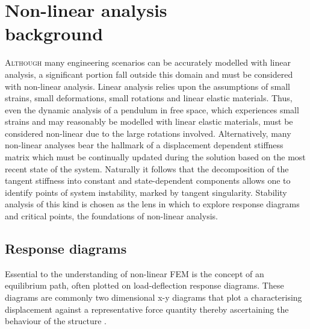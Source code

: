 


\chapter[Non-linear analysis background]{Non-linear analysis \\ background}
\label{chap:chapter_2_2}

\renewcommand{\Thema}{Non-linear analysis background}

\lettrine[lines=2]{A}{lthough} many engineering scenarios can be accurately modelled with linear analysis, a significant portion fall outside this domain and must be considered with non-linear analysis. Linear analysis relies upon the assumptions of small strains, small deformations, small rotations and linear elastic materials. Thus, even the dynamic analysis of a pendulum in free space, which experiences small strains and may reasonably be modelled with linear elastic materials, must be considered non-linear due to the large rotations involved. Alternatively, many non-linear analyses bear the hallmark of a displacement dependent stiffness matrix which must be continually updated during the solution based on the most recent state of the system. Naturally it follows that the decomposition of the tangent stiffness into constant and state-dependent components allows one to identify points of system instability, marked by tangent singularity. Stability analysis of this kind is chosen as the lens in which to explore response diagrams and critical points, the foundations of non-linear analysis.

\section{Response diagrams}
Essential to the understanding of non-linear FEM is the concept of an equilibrium path, often plotted on load-deflection response diagrams. These diagrams are commonly two dimensional x-y diagrams that plot a characterising displacement against a representative force quantity thereby ascertaining the behaviour of the structure \cite{FelippaNFEMTour2016}.

